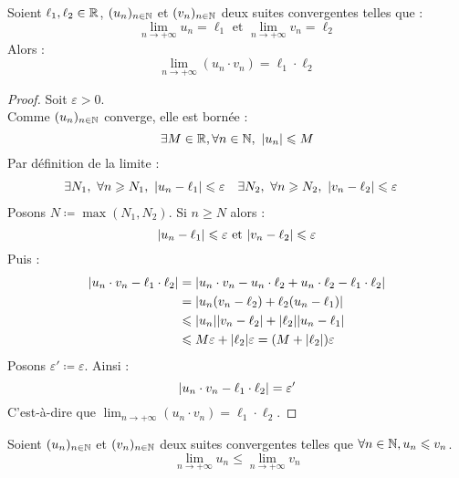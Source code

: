 \begin{theorem}
    Soient $\ell_1, \ell_2 \in \mathbb{R}$, $(u_n)_{n \in \mathbb{N}}$ et $(v_n)_{n \in \mathbb{N}}$ deux suites convergentes telles que :
    \[ \lim_{n \to + \infty} u_n = \ell_1 \text{ et } \lim_{n \to +\infty} v_n = \ell_2 \]
    Alors :
    \[ \lim_{n \to +\infty} (u_n \cdot v_n) = \ell_1 \cdot \ell_2 \]
\end{theorem}

\begin{proof}
    Soit $\varepsilon > 0$.
    \\
    Comme $(u_n)_{n \in \mathbb{N}}$ converge, elle est bornée :
    \[ \exists M \in \mathbb{R}, \forall n \in \mathbb{N},\ \abs{u_n} \leqslant M \]
    Par définition de la limite :
    \begin{align*}
        &\exists N_1,\ \forall n \geqslant N_1,\ \abs{u_n - \ell_1} \leqslant \varepsilon &
        &\exists N_2,\ \forall n \geqslant N_2,\ \abs{v_n - \ell_2} \leqslant \varepsilon
    \end{align*}
    Posons $N \coloneqq \max(N_1, N_2)$. Si $n \geq N$ alors :
    \[ \abs{u_n - \ell_1} \leqslant \varepsilon \text{ et } \abs{v_n - \ell_2} \leqslant \varepsilon \]
    Puis : 
    \begin{align*}
        \abs{u_n \cdot v_n - \ell_1 \cdot \ell_2} &= \abs{u_n \cdot v_n - u_n \cdot \ell_2 + u_n \cdot \ell_2 - \ell_1 \cdot \ell_2} \\
        &= \abs{u_n(v_n - \ell_2) + \ell_2 (u_n - \ell_1)} \\ 
        &\leqslant \abs{u_n} \abs{v_n - \ell_2} + \abs{\ell_2} \abs{u_n - \ell_1} \\ 
        &\leqslant M \varepsilon + \abs{\ell_2} \varepsilon = (M + \abs{\ell_2}) \varepsilon
    \end{align*}
    Posons $\varepsilon' \coloneqq \varepsilon$. Ainsi :
    \[ \abs{u_n \cdot v_n - \ell_1 \cdot \ell_2} = \varepsilon' \]
    C'est-à-dire que $\lim_{n \to +\infty} (u_n \cdot v_n) = \ell_1 \cdot \ell_2$.
\end{proof}

\begin{theorem}
    Soient $(u_n)_{n \in \mathbb{N}}$ et $(v_n)_{n \in \mathbb{N}}$ deux suites convergentes telles que $\forall n \in \mathbb{N}, u_n \leqslant v_n$. 
    \[ \lim_{n \to +\infty} u_n \leq \lim_{n \to +\infty} v_n \]
\end{theorem}

